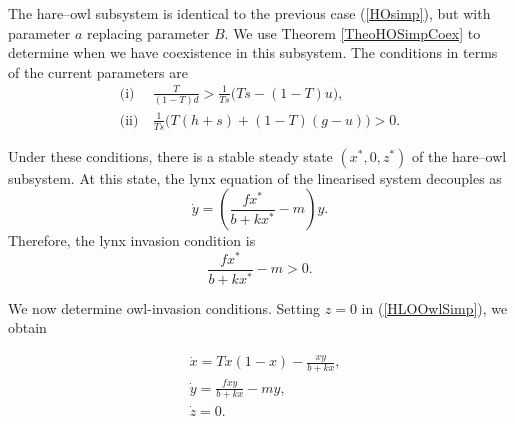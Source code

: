 \documentclass[12pt]{UOthesis}
\theoremstyle{remarkstyle}
\begin{document}
The hare--owl subsystem is identical to the previous case (\ref{HOsimp}), but with parameter $a$ replacing parameter $B$. We use Theorem \ref{TheoHOSimpCoex} to determine when we have coexistence in this subsystem. The conditions in terms of the current parameters are
\begin{equation}
	\begin{split}
		\text{(i)}&\ \frac{T}{(1-T)d}>\frac{1}{Ts}\Big(Ts-(1-T)u\Big),\\
		\text{(ii)}&\ \frac{1}{Ts}\Big(T(h+s)+(1-T)(g-u)\Big)>0.
	\end{split}
	\label{HLOOwlSimpHOCoexCond}
\end{equation}

Under these conditions, there is a stable steady state $(x^*,0,z^*)$ of the hare--owl subsystem. At this state, the lynx equation of the linearised system decouples as
$$\dot{y}=\left(\frac{fx^*}{b+kx^*}-m\right)y.$$
Therefore, the lynx invasion condition is
\begin{equation}
	\frac{fx^*}{b+kx^*}-m>0.
	\label{HLOOwlSimpLynxInvCond}
\end{equation}

We now determine owl-invasion conditions. Setting $z=0$ in (\ref{HLOOwlSimp}), we obtain

\begin{equation}
\begin{split}
&\dot{x}=Tx(1-x)-\frac{xy}{b+kx},\\
&\dot{y}=\frac{fxy}{b+kx}-my,\\
&\dot{z}=0.
\end{split}
\label{HLOOwlSimpz=0}
\end{equation}
\end{document}
